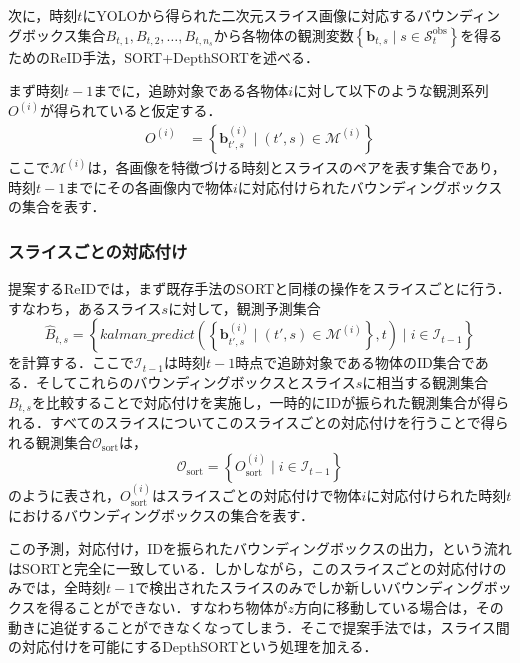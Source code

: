     次に，時刻$t$にYOLOから得られた二次元スライス画像に対応するバウンディングボックス集合$B_{t, 1}, B_{t, 2}, \dots, B_{t, n_s}$から各物体の観測変数$\left\{\bm{b}_{t, s} \mid s \in \mathcal{S}_t^{\text{obs}}\right\}$を得るためのReID手法，SORT+DepthSORTを述べる．

    まず時刻$t-1$までに，追跡対象である各物体$i$に対して以下のような観測系列$O^{(i)}$が得られていると仮定する．
    \begin{equation}
        \label{eq:tracks_on_reid}
        \begin{aligned}
            O^{(i)} &= \left\{\bm{b}_{t',s}^{(i)} \mid (t', s) \in \mathcal{M}^{(i)}\right\}
        \end{aligned}
    \end{equation}
    ここで$\mathcal{M}^{(i)}$は，各画像を特徴づける時刻とスライスのペアを表す集合であり，時刻$t-1$までにその各画像内で物体$i$に対応付けられたバウンディングボックスの集合を表す．

        \subsubsection{スライスごとの対応付け}

        提案するReIDでは，まず既存手法のSORTと同様の操作をスライスごとに行う．すなわち，あるスライス$s$に対して，観測予測集合
        \begin{equation}
            \label{eq:slice_wise_prediction}
            \hat{B}_{t, s} = \left\{kalman\_predict\left(\left\{\bm{b}_{t', s}^{(i)} \mid (t', s) \in \mathcal{M}^{(i)}\right\}, t\right) \mid i \in \mathcal{I}_{t-1}\right\}
        \end{equation}
        を計算する．ここで$\mathcal{I}_{t-1}$は時刻$t-1$時点で追跡対象である物体のID集合である．そしてこれらのバウンディングボックスとスライス$s$に相当する観測集合$B_{t,s}$を比較することで対応付けを実施し，一時的にIDが振られた観測集合が得られる．すべてのスライスについてこのスライスごとの対応付けを行うことで得られる観測集合$\mathcal{O}_{\text{sort}}$は，
        \begin{equation}
            \label{eq:sort_identified_bboxes}
            \mathcal{O}_{\text{sort}} = \left\{O_{\text{sort}}^{(i)} \mid i \in \mathcal{I}_{t-1}\right\}
        \end{equation}
        のように表され，$O_{\text{sort}}^{(i)}$はスライスごとの対応付けで物体$i$に対応付けられた時刻$t$におけるバウンディングボックスの集合を表す．
        
        この予測，対応付け，IDを振られたバウンディングボックスの出力，という流れはSORTと完全に一致している．しかしながら，このスライスごとの対応付けのみでは，全時刻$t-1$で検出されたスライスのみでしか新しいバウンディングボックスを得ることができない．すなわち物体が$z$方向に移動している場合は，その動きに追従することができなくなってしまう．そこで提案手法では，スライス間の対応付けを可能にするDepthSORTという処理を加える．


